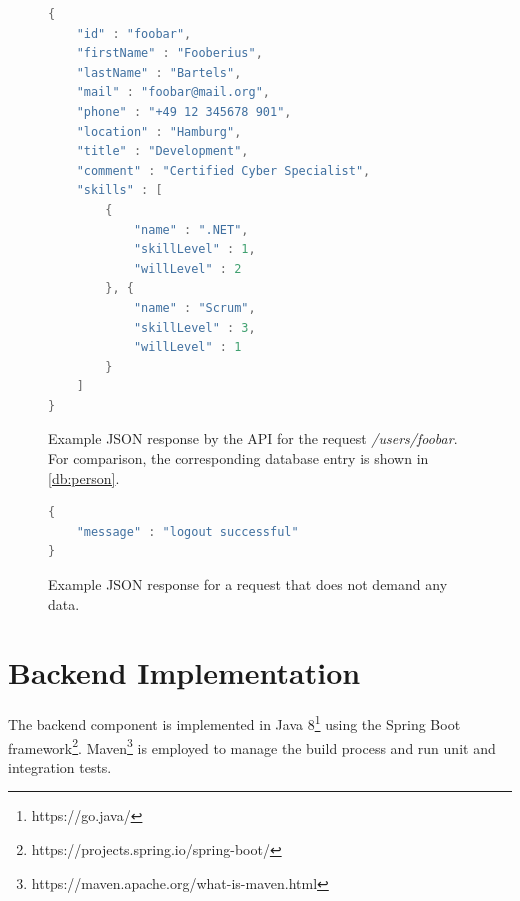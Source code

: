 \begin{figure}[h]
\begin{lstlisting}[language=Java]
{
	"id" : "foobar",
	"firstName" : "Fooberius",
	"lastName" : "Bartels",
	"mail" : "foobar@mail.org",
	"phone" : "+49 12 345678 901",
	"location" : "Hamburg",
	"title" : "Development",
	"comment" : "Certified Cyber Specialist",
	"skills" : [
		{
			"name" : ".NET",
			"skillLevel" : 1,
			"willLevel" : 2
		}, {
			"name" : "Scrum",
			"skillLevel" : 3,
			"willLevel" : 1
		}
	]
}
\end{lstlisting}
\caption[Data Structure: Person API Response]{Example JSON response by the API for the request \textit{/users/foobar}. For comparison, the corresponding database entry is shown in \ref{db:person}.}
\end{figure}


\begin{figure}[h]
\begin{lstlisting}[language=Java]
{
	"message" : "logout successful"
}
\end{lstlisting}
\caption[Data Structure: Status API Response]{Example JSON response for a request that does not demand any data.}
\end{figure}

\newpage

\section{Backend Implementation}
\label{impl:be}
The backend component is implemented in Java 8\footnote{https://go.java/} using the Spring Boot framework\footnote{https://projects.spring.io/spring-boot/}. Maven\footnote{https://maven.apache.org/what-is-maven.html} is employed to manage the build process and run unit and integration tests.

